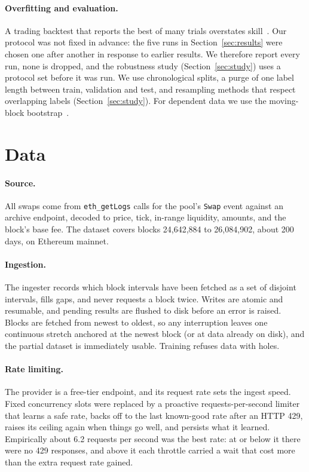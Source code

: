 \documentclass[11pt,a4paper]{article}
\begin{document}
\paragraph{Overfitting and evaluation.}
A trading backtest that reports the best of many trials overstates skill~\cite{bailey2014,white2000}.
Our protocol was not fixed in advance: the five runs in
Section~\ref{sec:results} were chosen one after another in response to earlier
results. We therefore report every run, none is dropped, and the robustness
study (Section~\ref{sec:study}) uses a protocol set before it was run. We use
chronological splits, a purge of one label length between train, validation and test, and
resampling methods that respect overlapping labels
(Section~\ref{sec:study}). For dependent data we use the moving-block
bootstrap~\cite{kunsch1989}.

\section{Data}
\label{sec:data}

\paragraph{Source.}
All swaps come from \texttt{eth\_getLogs} calls for the pool's \texttt{Swap}
event against an archive endpoint, decoded to price, tick, in-range liquidity,
amounts, and the block's base fee. The dataset covers blocks 24,642,884 to
26,084,902, about 200 days, on Ethereum mainnet.

\paragraph{Ingestion.}
The ingester records which block intervals have been fetched as a set of
disjoint intervals, fills gaps, and never requests a block twice. Writes are
atomic and resumable, and pending results are flushed to disk before an error
is raised. Blocks are fetched from newest to oldest, so any interruption
leaves one continuous stretch anchored at the newest block (or at data
already on disk), and the partial dataset is immediately usable. Training
refuses data with holes.

\paragraph{Rate limiting.}
The provider is a free-tier endpoint, and its request rate sets the ingest
speed. Fixed concurrency slots were replaced by a proactive
requests-per-second limiter that learns a safe rate, backs off to the last
known-good rate after an HTTP 429, raises its ceiling again when things go
well, and persists what it learned. Empirically about 6.2 requests per second
was the best rate: at or below it there were no 429 responses, and above it
each throttle carried a wait that cost more than the extra request rate
gained.
\end{document}
